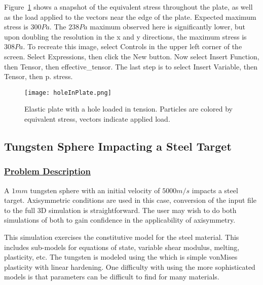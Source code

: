 Figure~\ref{fig:holeInPlate} shows a snapshot of the equivalent stress
throughout the plate, as well as the load applied to the vectors near the
edge of the plate.  Expected maximum stress is $300 Pa$.  The $238 Pa$ maximum
observed here is significantly lower, but upon doubling the resolution in the
x and y directions, the maximum stress is $308 Pa$.  To recreate this image, select
Controls in the upper left corner of the screen.  Select Expressions, then click the New 
button.  Now select Insert Function, then Tensor, then effective\_tensor.  The last step is
to select Insert Variable, then Tensor, then p. stress.  

\begin{figure}
  \center
  \texttt{[image: holeInPlate.png]}
  \caption{Elastic plate with a hole loaded in tension.  Particles are
           colored by equivalent stress, vectors indicate applied load.}
  \label{fig:holeInPlate}
\end{figure}

\newpage
\subsection*{\center Tungsten Sphere Impacting a Steel Target}
\subsubsection*{\underline{Problem Description}}
A $1 mm$ tungsten sphere with an initial velocity of $5000 m/s$
impacts a steel target.  Axisymmetric conditions are used in this case,
conversion of the input file to the full 3D simulation is straightforward.
The user may wish to do both simulations of both to gain confidence in the
applicability of axisymmetry. 

This simulation exercises the 
constitutive model for the
steel material. This includes sub-models for equations of state,
variable shear modulus, melting, plasticity, etc.  The tungsten is modeled
using the  which is simple vonMises
plasticity with linear hardening.  One difficulty with using the more 
sophisticated models is that parameters can be difficult to find for many
materials.

